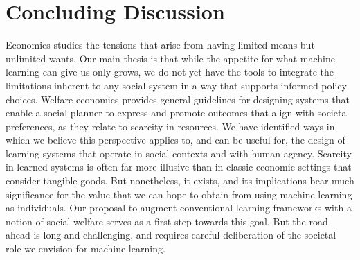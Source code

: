 \section{Concluding Discussion} \label{sec:discussion}

Economics studies the tensions that arise from having limited means but unlimited wants.
Our main thesis is that while the appetite for what machine learning can give us only grows,
we do not yet have the tools to integrate the limitations inherent to any social system
in a way that supports informed policy choices.
Welfare economics provides general guidelines for designing systems that enable a social planner to express and promote outcomes that align with societal preferences, as they relate to scarcity in resources.
We have identified ways in which we believe this perspective applies to, and can be useful for, the design of learning systems that operate in social contexts and with human agency.
Scarcity in learned systems is often far more illusive than in classic economic settings that consider tangible goods.
But nonetheless, it exists, and its implications bear much significance for the value that we can hope to obtain from using machine learning as individuals.
Our proposal to augment conventional learning frameworks with a notion of social welfare
serves as a first step towards this goal. But the road ahead is long and challenging,
and requires careful deliberation of the societal role we envision for machine learning.
 





 

